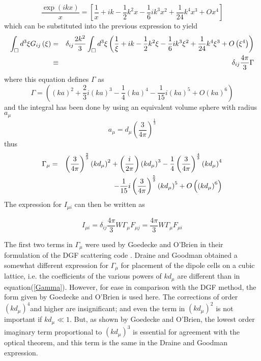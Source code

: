 \documentclass{article}
\begin{document}
\begin{equation}
\frac{\exp (ikx)}{x}=\left[ \frac{1}{x}+ik-\frac{1}{2}k^{2}x-\frac{1}{6}%
ik^{3}x^{2}+\frac{1}{24}k^{4}x^{3}+Ox^{4}\right]
\end{equation}%
which can be substituted into the previous expression to yield 
\begin{eqnarray}
\int_{\Box }d^{3}\xi G_{ij}\left( \mathbf{\xi }\right) &=&\delta _{ij}\frac{%
2k^{2}}{3}\int_{\Box }d^{3}\xi \left( \frac{1}{\xi }+ik-\frac{1}{2}k^{2}\xi -%
\frac{1}{6}ik^{3}\xi ^{2}+\frac{1}{24}k^{4}\xi ^{3}+O\left( \xi ^{4}\right)
\right)  \nonumber \\
&\equiv &\delta _{ij}\frac{4\pi }{3}\Gamma
\end{eqnarray}%
where this equation defines $\Gamma $ as 
\begin{equation}
\Gamma =\left( \left( ka\right) ^{2}+\allowbreak \frac{2}{3}\allowbreak
i\left( ka\right) ^{3}-\frac{1}{4}\left( ka\right) ^{4}-\frac{1}{15}i\left(
ka\right) ^{5}+O\left( ka\right) ^{6}\right)
\end{equation}%
and the integral has been done by using an equivalent volume sphere with
radius $a_{\mu }$ 
\begin{equation}
a_{\mu }=d_{\mu }\left( \frac{3}{4\pi }\right) ^{\frac{1}{3}}
\end{equation}%
thus 
\begin{eqnarray}
\Gamma _{\mu } &=&\left( \frac{3}{4\pi }\right) ^{\frac{2}{3}}\left( kd_{\mu
}\right) ^{2}+\allowbreak \allowbreak \left( \frac{\allowbreak \allowbreak i%
}{2\pi }\right) \left( kd_{\mu }\right) ^{3}-\frac{1}{4}\left( \frac{3}{4\pi 
}\right) ^{\frac{4}{3}}\left( kd_{\mu }\right) ^{4}  \label{Gamma1} \\
&&-\frac{1}{15}i\left( \frac{3}{4\pi }\right) ^{\frac{5}{3}}\left( kd_{\mu
}\right) ^{5}+O\left( \left( kd_{\mu }\right) ^{6}\right)  \nonumber
\end{eqnarray}%
The expression for $I_{\mu i}$ can then be written as

\begin{equation}
I_{\mu i}=\delta _{ij}\frac{4\pi }{3}W\Gamma _{\mu }F_{\mu j}=\frac{4\pi }{3}%
W\Gamma _{\mu }F_{\mu i}  \label{ST1}
\end{equation}

The first two terms in $\Gamma _{\mu }$ were used by Goedecke and O'Brien in
their formulation of the DGF scattering code \cite{Goedecke88}. Draine and
Goodman obtained a somewhat different expression for $\Gamma _{\mu }$ for
placement of the dipole cells on a cubic lattice\cite{Draine93}, i.e. the
coefficients of the various powers of $kd_{\mu }$ are different than in
equation(\ref{Gamma}). However, for ease in comparison with the DGF method,
the form given by Goedecke and O'Brien is used here. The corrections of
order $\left( kd_{\mu }\right) ^{4}$and higher are insignificant; and even
the term in $\left( kd_{\mu }\right) ^{2}$ is not important if $kd_{\mu }\ll
1.$ But, as shown by Goedecke and O'Brien, the lowest order imaginary term
proportional to $\left( kd_{\mu }\right) ^{3}$ is essential for agreement
with the optical theorem, and this term is the same in the Draine and
Goodman expression.
\end{document}
